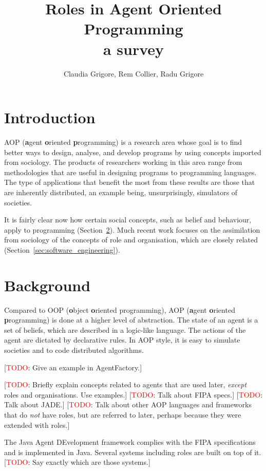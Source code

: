 \documentclass{article}
\title{Roles in Agent Oriented Programming\\\normalsize{a survey}}
\author{Claudia Grigore, Rem Collier, Radu Grigore}
\def\fb#1{\textbf{#1}}
\newcommand{\todo}[1]{[\textcolor{red}{TODO}: #1]}
\begin{document}
\maketitle

\begin{abstract}
\end{abstract}
\section{Introduction}

AOP (\fb agent \fb oriented \fb programming) is a research area
whose goal is to find better ways to design, analyse, and develop
programs by using concepts imported from sociology. The products
of researchers working in this area range from methodologies that
are useful in designing programs to programming languages. The
type of applications that benefit the most from these results
are those that are inherently distributed, an example being,
unsurprisingly, simulators of societies.

It is fairly clear now how certain social concepts,
such as belief and behaviour, apply to programming
(Section~\ref{sec:background}). Much recent work focuses
on the assimilation from sociology of the concepts
of role and organisation, which are closely related
(Section~\ref{sec:software_engineering}).
\section{Background}
\label{sec:background}

Compared to OOP (\fb object \fb oriented programming), AOP (\fb
agent \fb oriented \fb programming) is done at a higher level of
abstraction. The state of an agent is a set of beliefs, which
are described in a logic-like language. The actions of the agent
are dictated by declarative rules. In AOP style, it is easy to
simulate societies and to code distributed algorithms.

\todo{Give an example in AgentFactory.}

\todo{Briefly explain concepts related to agents that are used later,
  \emph{except} roles and organisations. Use examples.}
\todo{Talk about FIPA specs.}
\todo{Talk about JADE.}
\todo{Talk about other AOP languages and frameworks that do \emph{not}
  have roles, but are referred to later, perhaps because they were
  extended with roles.}

The Java Agent DEvelopment framework complies with the FIPA
specifications and is implemented in Java. Several systems
including roles are built on top of it. \todo{Say exactly which
are those systems.}
\end{document}
